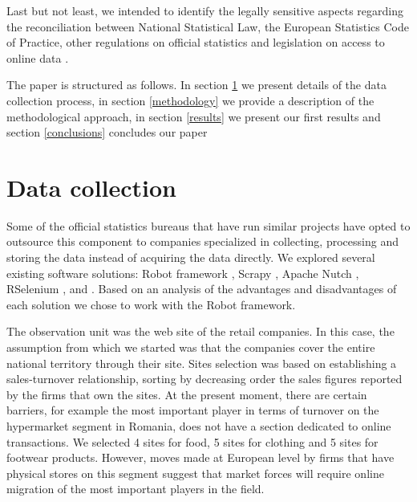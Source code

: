 \documentclass[]{article}
\begin{document}
Last but not least, we intended to identify the legally sensitive aspects regarding the reconciliation between 
National Statistical Law, the European Statistics Code of Practice, other regulations on official statistics 
and legislation on access to online data \cite{swier}.

The paper is structured as follows. In section \ref{section2} we present details of the data collection process, 
in section \ref{methodology} we provide a description of the methodological approach, in section \ref{results} we present our first results and 
section \ref{conclusions} concludes our paper


\section{Data collection}\label{section2}

Some of the official statistics bureaus that have run similar projects have opted to outsource this component to companies specialized 
in collecting, processing and storing the data instead of acquiring the data directly. We explored several existing software solutions: 
Robot framework \cite{robot2018}, Scrapy \cite{scrapy1}, \cite{scrapy2} Apache Nutch \cite{nutch}, RSelenium \cite{rs1},
and \cite{rvest}. 
Based on an analysis of the advantages and disadvantages of each solution we chose to work with the Robot framework. 


The observation unit was the web site of the retail companies. In this case, the assumption from which we started was 
that the companies cover the entire national territory through their site. Sites selection was based on establishing a 
sales-turnover relationship, sorting by decreasing order the sales figures reported by the firms that own the sites. 
At the present moment, there are certain barriers, for example the most important player in terms of turnover on the 
hypermarket segment in Romania, does not have a section dedicated to online transactions. We selected 4 sites for food, 
5 sites for clothing and 5 sites for footwear products. However, moves made at European level by firms that have physical 
stores on this segment suggest that market forces will require online migration of the most important players in the field.
\end{document}
